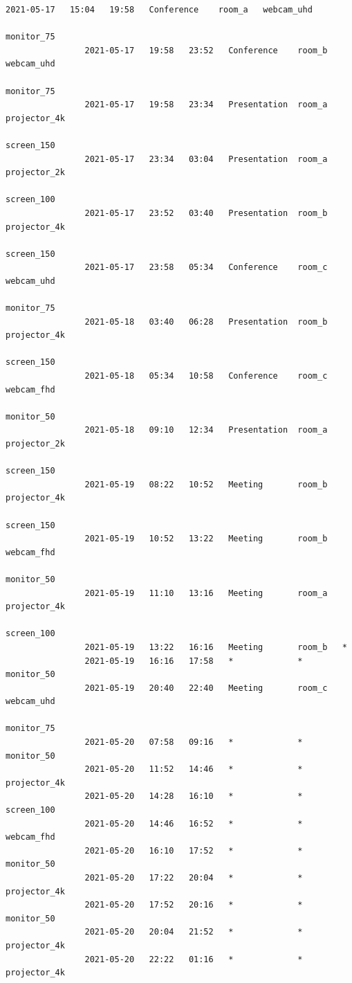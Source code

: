 \documentclass{article}
\begin{document}
\begin{Verbatim}[gobble=8]
                2021-05-17   15:04   19:58   Conference    room_a   webcam_uhd
                                                                    monitor_75
                2021-05-17   19:58   23:52   Conference    room_b   webcam_uhd
                                                                    monitor_75
                2021-05-17   19:58   23:34   Presentation  room_a   projector_4k
                                                                    screen_150
                2021-05-17   23:34   03:04   Presentation  room_a   projector_2k
                                                                    screen_100
                2021-05-17   23:52   03:40   Presentation  room_b   projector_4k
                                                                    screen_150
                2021-05-17   23:58   05:34   Conference    room_c   webcam_uhd
                                                                    monitor_75
                2021-05-18   03:40   06:28   Presentation  room_b   projector_4k
                                                                    screen_150
                2021-05-18   05:34   10:58   Conference    room_c   webcam_fhd
                                                                    monitor_50
                2021-05-18   09:10   12:34   Presentation  room_a   projector_2k
                                                                    screen_150
                2021-05-19   08:22   10:52   Meeting       room_b   projector_4k
                                                                    screen_150
                2021-05-19   10:52   13:22   Meeting       room_b   webcam_fhd
                                                                    monitor_50
                2021-05-19   11:10   13:16   Meeting       room_a   projector_4k
                                                                    screen_100
                2021-05-19   13:22   16:16   Meeting       room_b   *
                2021-05-19   16:16   17:58   *             *        monitor_50
                2021-05-19   20:40   22:40   Meeting       room_c   webcam_uhd
                                                                    monitor_75
                2021-05-20   07:58   09:16   *             *        monitor_50
                2021-05-20   11:52   14:46   *             *        projector_4k
                2021-05-20   14:28   16:10   *             *        screen_100
                2021-05-20   14:46   16:52   *             *        webcam_fhd
                2021-05-20   16:10   17:52   *             *        monitor_50
                2021-05-20   17:22   20:04   *             *        projector_4k
                2021-05-20   17:52   20:16   *             *        monitor_50
                2021-05-20   20:04   21:52   *             *        projector_4k
                2021-05-20   22:22   01:16   *             *        projector_4k
                

\end{Verbatim}
\end{document}
